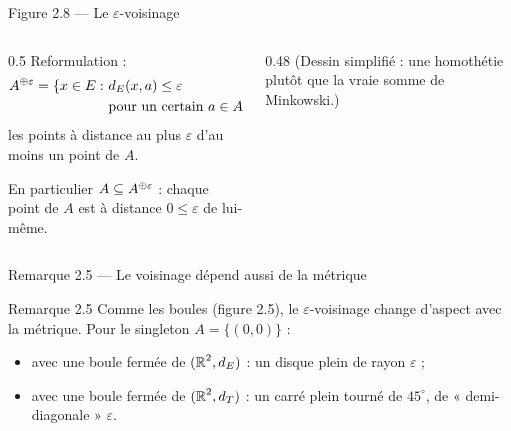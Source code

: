\begin{frame}{Figure 2.8 --- Le $\varepsilon$-voisinage}
  \begin{columns}[c]
    \begin{column}{0.5\textwidth}
      \small Reformulation :
      \[
        \begin{aligned}
          A^{\oplus \varepsilon} = \{x\in E :\ & d_E(x,a)\leq\varepsilon\\
          & \text{pour un certain } a\in A\},
        \end{aligned}
      \]
      les points à distance au plus $\varepsilon$ d'au moins un
      point de $A$.
      \vspace{6pt}

      En particulier $A\subseteq A^{\oplus \varepsilon}$ : chaque point
      de $A$ est à distance $0\leq\varepsilon$ de lui-même.
    \end{column}
    \begin{column}{0.48\textwidth}
      \scriptsize (Dessin simplifié : une homothétie plutôt que la vraie
      somme de Minkowski.)
    \end{column}
  \end{columns}
\end{frame}

\begin{frame}{Remarque 2.5 --- Le voisinage dépend aussi de la métrique}
  \begin{Rem}{Remarque 2.5}
    Comme les boules (figure 2.5), le $\varepsilon$-voisinage change
    d'aspect avec la métrique. Pour le singleton $A=\{(0,0)\}$ :
    \begin{itemize}
      \item avec une boule fermée de $(\operatorname{\mathbb{R}}^2,d_E)$ : un disque
        plein de rayon $\varepsilon$ ;
      \item avec une boule fermée de $(\operatorname{\mathbb{R}}^2,d_T)$ : un carré
        plein tourné de $45^\circ$, de « demi-diagonale » $\varepsilon$.
    \end{itemize}
  \end{Rem}
\end{frame}

